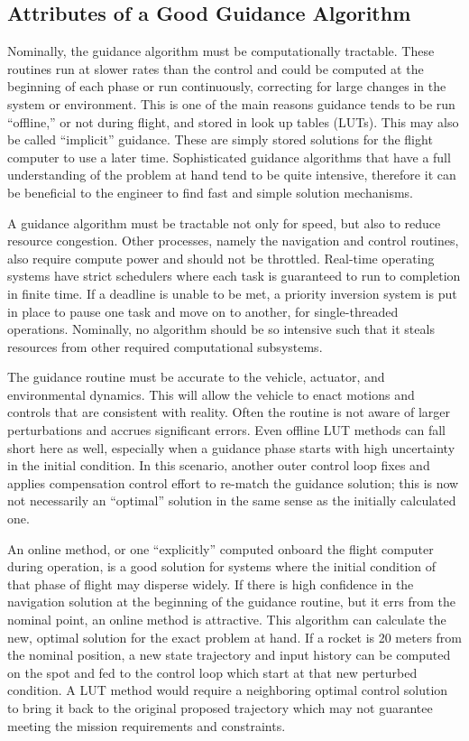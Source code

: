 \subsection{Attributes of a Good Guidance Algorithm}
Nominally, the guidance algorithm must be computationally tractable. These routines run at slower rates than the control and could be computed at the beginning of each phase or run continuously, correcting for large changes in the system or environment.
This is one of the main reasons guidance tends to be run ``offline,'' or not during flight, and stored in look up tables (LUTs). This may also be called ``implicit'' guidance. These are simply stored solutions for the flight computer to use a later time. Sophisticated guidance algorithms that have a full understanding of the problem at hand tend to be quite intensive, therefore it can be beneficial to the engineer to find fast and simple solution mechanisms.

A guidance algorithm must be tractable not only for speed, but also to reduce resource congestion. Other processes, namely the navigation and control routines, also require compute power and should not be throttled. Real-time operating systems have strict schedulers where each task is guaranteed to run to completion in finite time. If a deadline is unable to be met, a priority inversion system is put in place to pause one task and move on to another, for single-threaded operations. Nominally, no algorithm should be so intensive such that it steals resources from other required computational subsystems.

The guidance routine must be accurate to the vehicle, actuator, and environmental dynamics. This will allow the vehicle to enact motions and controls that are consistent with reality. Often the routine is not aware of larger perturbations and accrues significant errors. Even offline LUT methods can fall short here as well, especially when a guidance phase starts with high uncertainty in the initial condition. In this scenario, another outer control loop fixes and applies compensation control effort to re-match the guidance solution; this is now not necessarily an ``optimal'' solution in the same sense as the initially calculated one.

An online method, or one ``explicitly'' computed onboard the flight computer during operation, is a good solution for systems where the initial condition of that phase of flight may disperse widely. If there is high confidence in the navigation solution at the beginning of the guidance routine, but it errs from the nominal point, an online method is attractive. This algorithm can calculate the new, optimal solution for the exact problem at hand. If a rocket is 20 meters from the nominal position, a new state trajectory and input history can be computed on the spot and fed to the control loop which start at that new perturbed condition. A LUT method would require a neighboring optimal control solution to bring it back to the original proposed trajectory which may not guarantee meeting the mission requirements and constraints.

